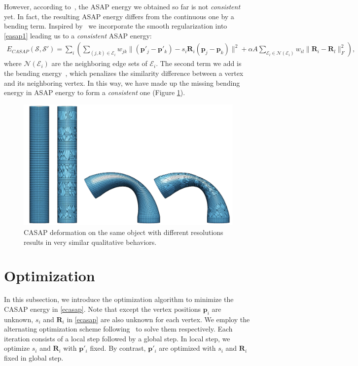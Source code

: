 However, according to~\cite{chao2010simple}, the ASAP energy we obtained so far is not \emph{consistent} yet. In fact, the resulting ASAP energy differs from the continuous one by a bending term. Inspired by~\cite{levi2015smooth} we incorporate the smooth regularization into \eqref{easap1} leading us to a \emph{consistent} ASAP energy:
\begin{align}
E_{\!C\!A\!S\!A\!P\!}(\mathcal S\!,\! \mathcal S'\!)\!\!=\!\!\displaystyle \sum_i\!(\!\!\!\sum_{(j,k)\in\mathcal{E}_i}\!\!\!\!w_{jk}\|(\mathbf p'_j\!\! -\!\! \mathbf p'_k)\!\!-\!\!s_i\!\mathbf R_i(\mathbf p_j - \mathbf p_k)\|^2\!\! +\!\!\alpha A\!\!\!\!\sum_{\mathcal{E}_l \in \mathcal{N}(\mathcal{E}_i)}\!\!\!\!\!\!w_{il}\|\mathbf R_i\!\!-\!\!\mathbf R_l\|_F^2 ),\label{ecasap}
\end{align}
where $\mathcal{N}(\mathcal{E}_i)$ are the neighboring edge sets of $\mathcal{E}_i$. The second term we add is the bending energy~\cite{levi2015smooth}, which penalizes the similarity difference between a vertex and its neighboring vertex. In this way, we have made up the missing bending energy in ASAP energy to form a \emph{consistent} one (Figure \ref{fig:consistent}).
\begin{figure}[h!tb]
	\begin{center}
			\includegraphics[width=0.9\columnwidth]{./figure/consistent_display.png}
	\end{center}
	\caption{CASAP deformation on the same object with different resolutions results in very similar qualitative behaviors.}
	\label{fig:consistent}
\end{figure}


\section{Optimization}
In this subsection, we introduce the optimization algorithm to minimize the CASAP energy in \eqref{ecasap}. Note that except the vertex positions $\mathbf p_i$ are unknown, $s_i$ and $\mathbf R_i$ in \eqref{ecasap} are also unknown for each vertex. We employ the alternating optimization scheme following~\citep{sorkine2007rigid,yamazaki2013non,levi2015smooth} to solve them respectively. Each iteration consists of a local step followed by a global step. In local step, we optimize $s_i$ and $\mathbf R_i$ with $\mathbf p'_i$ fixed. By contrast, $\mathbf p'_i$ are optimized with $s_i$ and $\mathbf R_i$ fixed in global step.\\


